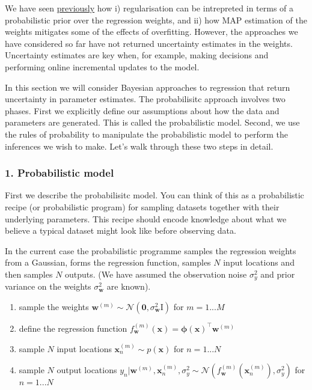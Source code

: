 \documentclass[11pt]{article}
\begin{document}
We have seen \href{regression_regularisation.ipynb}{previously} how i)
regularisation can be intrepreted in terms of a probabilistic prior over
the regression weights, and ii) how MAP estimation of the weights
mitigates some of the effects of overfitting. However, the approaches we
have considered so far have not returned uncertainty estimates in the
weights. Uncertainty estimates are key when, for example, making
decisions and performing online incremental updates to the model.

In this section we will consider Bayesian approaches to regression that
return uncertainty in parameter estimates. The probabilisitc approach
involves two phases. First we explicitly define our assumptions about
how the data and parameters are generated. This is called the
probabilistic model. Second, we use the rules of probability to
manipulate the probabilistic model to perform the inferences we wish to
make. Let's walk through these two steps in detail.

\subsubsection{1. Probabilistic model}\label{probabilistic-model}

First we describe the probabilisitc model. You can think of this as a
probabilistic recipe (or probabilistic program) for sampling datasets
together with their underlying parameters. This recipe should encode
knowledge about what we believe a typical dataset might look like before
observing data.

In the current case the probabilistic programme samples the regression
weights from a Gaussian, forms the regression function, samples \(N\)
input locations and then samples \(N\) outputs. (We have assumed the
observation noise \(\sigma_y^2\) and prior variance on the weights
\(\sigma_{\mathbf{w}}^2\) are known).

\begin{enumerate}
\def\labelenumi{\arabic{enumi}.}
\item
  sample the weights
  \(\mathbf{w}^{(m)} \sim \mathcal{N}(\mathbf{0},\sigma_{\mathbf{w}}^2 \mathrm{I})\)
  for \(m=1...M\)
\item
  define the regression function
  \(f_{\mathbf{w}}^{(m)}(\mathbf{x})=\boldsymbol{\phi}(\mathbf{x})^\top \mathbf{w}^{(m)}\)
\item
  sample \(N\) input locations \(\mathbf{x}^{(m)}_n \sim p(\mathbf{x})\)
  for \(n=1...N\)
\item
  sample \(N\) output locations
  \(y_n |\mathbf{w}^{(m)},\mathbf{x}^{(m)}_n,\sigma_{y}^2 \sim \mathcal{N}(f^{(m)}_{\mathbf{w}}(\mathbf{x}^{(m)}_n),\sigma_{y}^2)\)
  for \(n=1...N\)
\end{enumerate}
\end{document}
